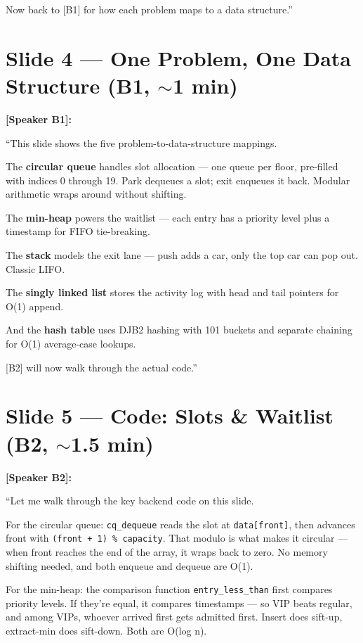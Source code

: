 \documentclass[12pt, a4paper]{article}
\begin{document}
Now back to [B1] for how each problem maps to a data structure.''

\section{Slide 4 --- One Problem, One Data Structure (B1, $\sim$1 min)}

\textbf{[Speaker B1]:}

``This slide shows the five problem-to-data-structure mappings.

The \textbf{circular queue} handles slot allocation --- one queue per floor, pre-filled with indices 0 through 19. Park dequeues a slot; exit enqueues it back. Modular arithmetic wraps around without shifting.

The \textbf{min-heap} powers the waitlist --- each entry has a priority level plus a timestamp for FIFO tie-breaking.

The \textbf{stack} models the exit lane --- push adds a car, only the top car can pop out. Classic LIFO.

The \textbf{singly linked list} stores the activity log with head and tail pointers for O(1) append.

And the \textbf{hash table} uses DJB2 hashing with 101 buckets and separate chaining for O(1) average-case lookups.

[B2] will now walk through the actual code.''

\section{Slide 5 --- Code: Slots \& Waitlist (B2, $\sim$1.5 min)}

\textbf{[Speaker B2]:}

``Let me walk through the key backend code on this slide.

For the circular queue: \texttt{cq\_dequeue} reads the slot at \texttt{data[front]}, then advances front with \texttt{(front + 1) \% capacity}. That modulo is what makes it circular --- when front reaches the end of the array, it wraps back to zero. No memory shifting needed, and both enqueue and dequeue are O(1).

For the min-heap: the comparison function \texttt{entry\_less\_than} first compares priority levels. If they're equal, it compares timestamps --- so VIP beats regular, and among VIPs, whoever arrived first gets admitted first. Insert does sift-up, extract-min does sift-down. Both are O(log n).
\end{document}
